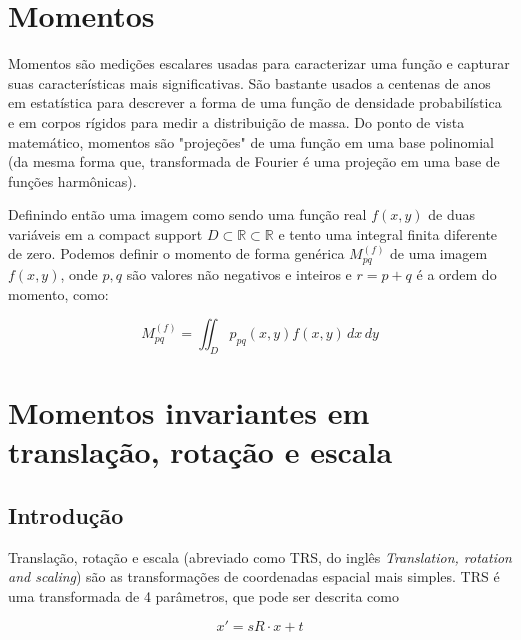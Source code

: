 \section{Momentos}

Momentos são medições escalares usadas para caracterizar uma função e capturar suas características mais significativas. São bastante usados a centenas de anos em estatística para descrever a forma de uma função de densidade probabilística e em corpos rígidos para medir a distribuição de massa.
Do ponto de vista matemático, momentos são "projeções" de uma função em uma base polinomial (da mesma forma que, transformada de Fourier é uma projeção em uma base de funções harmônicas).

Definindo então uma imagem como sendo uma função real \( f(x,y) \) de duas variáveis em a compact support \( D \subset \mathbb{R} \subset \mathbb{R} \) e tento uma integral finita diferente de zero. Podemos definir o momento de forma genérica \( M_{pq}^{(f)} \) de uma imagem \( f(x, y) \), onde \( p, q \) são valores não negativos e inteiros e \( r = p + q \) é a ordem do momento, como:

\[ M_{pq}^{(f)} = \iint_D p_{pq} (x, y) f(x, y) \,dx \,dy \]

\section{Momentos invariantes em translação, rotação e escala}

\subsection{Introdução}

Translação, rotação e escala (abreviado como TRS, do inglês \textit{Translation, rotation and scaling}) são as transformações de coordenadas espacial mais simples. TRS é uma transformada de 4 parâmetros, que pode ser descrita como

\[x' = sR \cdot x + t \]

